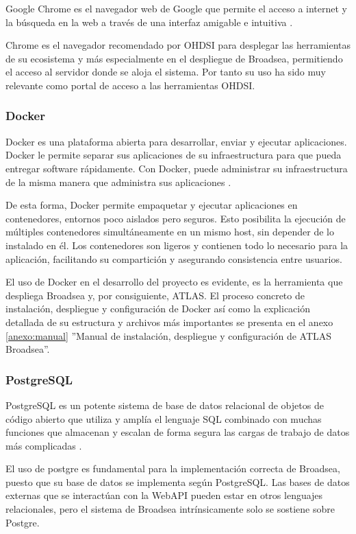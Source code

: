 Google Chrome es el navegador web de Google que permite el acceso a internet y la búsqueda en la web a través de una interfaz amigable e intuitiva \cite{GoogleChrome}. 

Chrome es el navegador recomendado por OHDSI para desplegar las herramientas de su ecosistema y más especialmente en el despliegue de Broadsea, permitiendo el acceso al servidor donde se aloja el sistema. Por tanto su uso ha sido muy relevante como portal de acceso a las herramientas OHDSI.


\subsubsection{Docker}

Docker es una plataforma abierta para desarrollar, enviar y ejecutar aplicaciones. Docker le permite separar sus aplicaciones de su infraestructura para que pueda entregar software rápidamente. Con Docker, puede administrar su infraestructura de la misma manera que administra sus aplicaciones \cite{DockerWebsite}.

De esta forma, Docker permite empaquetar y ejecutar aplicaciones en contenedores, entornos poco aislados pero seguros. Esto posibilita la ejecución de múltiples contenedores simultáneamente en un mismo host, sin depender de lo instalado en él. Los contenedores son ligeros y contienen todo lo necesario para la aplicación, facilitando su compartición y asegurando consistencia entre usuarios. 

El uso de Docker en el desarrollo del proyecto es evidente, es la herramienta que despliega Broadsea y, por consiguiente, ATLAS. El proceso concreto de instalación, despliegue y configuración de Docker así como la explicación detallada de su estructura y archivos más importantes se presenta en el anexo \ref{anexo:manual} ''Manual de instalación, despliegue y configuración de ATLAS Broadsea''.

\subsubsection{PostgreSQL}

PostgreSQL es un potente sistema de base de datos relacional de objetos de código abierto que utiliza y amplía el lenguaje SQL combinado con muchas funciones que almacenan y escalan de forma segura las cargas de trabajo de datos más complicadas \cite{PostgreWebsite}.

El uso de postgre es fundamental para la implementación correcta de Broadsea, puesto que su base de datos se implementa según PostgreSQL. Las bases de datos externas que se interactúan con la WebAPI pueden estar en otros lenguajes relacionales, pero el sistema de Broadsea intrínsicamente solo se sostiene sobre Postgre.

